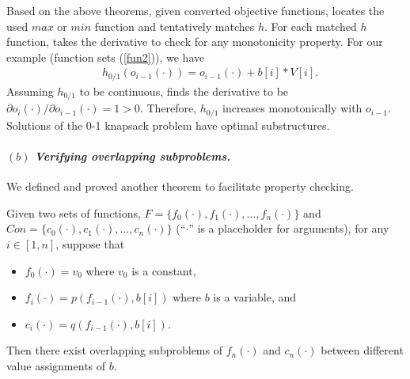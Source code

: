 
Based on the above theorems, given converted objective functions, \tool locates the used $max$ or $min$ function and tentatively matches $h$. 
For each matched $h$ function, \tool takes the derivative to check for any monotonicity property.
For our example (function sets (\ref{fun2})), we have 
\begin{align}
    & h_{0/1}(o_{i-1}(\cdot))=o_{i-1}(\cdot)+b[i]*V[i]. \nonumber
\end{align}
Assuming $h_{0/1}$ to be continuous, \tool finds the derivative to be $\partial o_i(\cdot)/\partial o_{i-1}(\cdot)=1>0$. Therefore, $h_{0/1}$ increases monotonically with $o_{i-1}$. Solutions of the 0-1 knapsack problem have   optimal substructures.  


\paragraph{$(b)$ \emph{Verifying overlapping subproblems.}} We defined and proved another theorem to facilitate property checking. 

\begin{theorem}
\label{thm2}
Given two sets of functions, $F=\{f_0(\cdot), f_1(\cdot), \ldots, f_n(\cdot)\}$ and $Con=\{c_0(\cdot), c_1(\cdot), \ldots, c_n(\cdot)\}$ (``$\cdot$'' is a placeholder for arguments), for 
any $i\in[1, n]$, suppose that 
\begin{itemize}
\item $f_0(\cdot)=v_0$ where $v_0$ is a constant, 
\item $f_i(\cdot)=p(f_{i-1}(\cdot), b[i])$ where $b$ is a variable, and
\item $c_i(\cdot)=q(f_{i-1}(\cdot), b[i])$. 
\end{itemize}
Then there exist overlapping subproblems of $f_n(\cdot)$ and $c_n(\cdot)$ 
between different value assignments of $b$.
\end{theorem}

